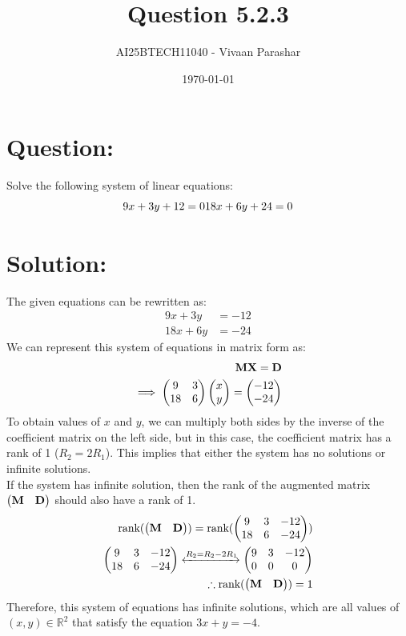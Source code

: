 \documentclass[a4paper, 12pt]{article}
\title{Question 5.2.3}
\author{AI25BTECH11040 - Vivaan Parashar}
\date{\today}
\begin{document}
\maketitle

\section{Question: }
Solve the following system of linear equations:
\[
    9x + 3y + 12 = 0\\
    18x + 6y + 24 = 0
\]

\section{Solution: }
The given equations can be rewritten as:
\begin{align}
    9x + 3y &= -12 \\
    18x + 6y &= -24
\end{align}
We can represent this system of equations in matrix form as:
\begin{align}
    \mathbf{M}\mathbf{X} = \mathbf{D}\\
    \implies \begin{pmatrix}9 & 3 \\ 18 & 6\end{pmatrix} \begin{pmatrix}x \\ y\end{pmatrix} = \begin{pmatrix}-12 \\ -24\end{pmatrix}
\end{align}
To obtain values of $x$ and $y$, we can multiply both sides by the inverse of the coefficient matrix on the left side, but in this case, the coefficient matrix has a rank of 1 ($R_2 = 2R_1$). This implies that either the system has no solutions or infinite solutions.\\
If the system has infinite solution, then the rank of the augmented matrix $\begin{pmatrix}\mathbf{M} & \mathbf{D}\end{pmatrix}$ should also have a rank of 1.
\begin{align}
    \text{rank}(\begin{pmatrix}\mathbf{M} & \mathbf{D}\end{pmatrix}) = \text{rank}(\begin{pmatrix}9 & 3 & -12 \\ 18 & 6 & -24\end{pmatrix})\\
    \begin{pmatrix}9 & 3 & -12 \\ 18 & 6 & -24\end{pmatrix} \xleftrightarrow{R_2 = R_2 - 2R_1} \begin{pmatrix}9 & 3 & -12 \\ 0 & 0 & 0\end{pmatrix}\\
    \therefore \text{rank}(\begin{pmatrix}\mathbf{M} & \mathbf{D}\end{pmatrix}) = 1
\end{align}
Therefore, this system of equations has infinite solutions, which are all values of $(x, y) \in \mathbb{R}^2$ that satisfy the equation $3x + y = -4$.\\
\end{document}
